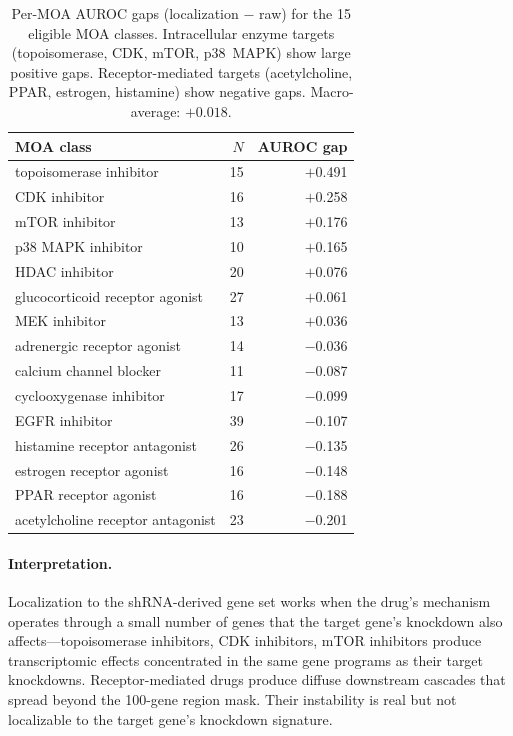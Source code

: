 \documentclass{article}
\begin{document}
\begin{table}[t]
\centering
\caption{Per-MOA AUROC gaps (localization $-$ raw) for the 15 eligible MOA
classes. Intracellular enzyme targets (topoisomerase, CDK, mTOR, p38~MAPK)
show large positive gaps. Receptor-mediated targets (acetylcholine, PPAR,
estrogen, histamine) show negative gaps. Macro-average: $+0.018$.}
\label{tab:loc_moa}
\small
\begin{tabular}{lrr}
\toprule
MOA class & $N$ & AUROC gap \\
\midrule
topoisomerase inhibitor & 15 & $+$0.491 \\
CDK inhibitor & 16 & $+$0.258 \\
mTOR inhibitor & 13 & $+$0.176 \\
p38 MAPK inhibitor & 10 & $+$0.165 \\
HDAC inhibitor & 20 & $+$0.076 \\
glucocorticoid receptor agonist & 27 & $+$0.061 \\
MEK inhibitor & 13 & $+$0.036 \\
\midrule
adrenergic receptor agonist & 14 & $-$0.036 \\
calcium channel blocker & 11 & $-$0.087 \\
cyclooxygenase inhibitor & 17 & $-$0.099 \\
EGFR inhibitor & 39 & $-$0.107 \\
histamine receptor antagonist & 26 & $-$0.135 \\
estrogen receptor agonist & 16 & $-$0.148 \\
PPAR receptor agonist & 16 & $-$0.188 \\
acetylcholine receptor antagonist & 23 & $-$0.201 \\
\bottomrule
\end{tabular}
\end{table}

\paragraph{Interpretation.}
Localization to the shRNA-derived gene set works when the drug's mechanism
operates through a small number of genes that the target gene's knockdown
also affects---topoisomerase inhibitors, CDK inhibitors, mTOR inhibitors
produce transcriptomic effects concentrated in the same gene programs as
their target knockdowns. Receptor-mediated drugs produce diffuse downstream
cascades that spread beyond the 100-gene region mask. Their instability is
real but not localizable to the target gene's knockdown signature.
\end{document}

